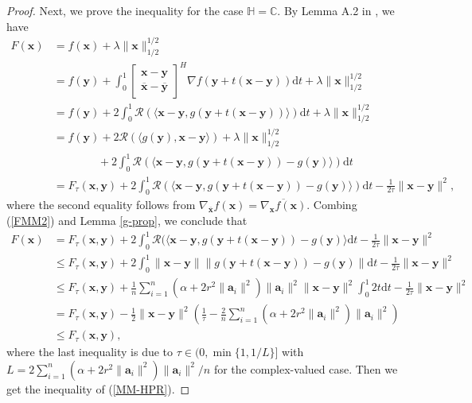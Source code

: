 \documentclass{article}
\numberwithin{equation}{section}
\begin{document}
\begin{proof}
Next, we prove the inequality for the case  $\mathbb{H}=\mathbb{C}$.
By Lemma A.2 in \cite{sun2018geometric}, we have
\begin{equation}\label{FMM2}
\begin{aligned}
	F(\mathbf{x})
	&=f(\mathbf{x})+\lambda\|\mathbf{x}\|_{1/2}^{1/2}\\
	&=f(\mathbf{y})+\int_0^1\begin{bmatrix} \mathbf{x}-\mathbf{y} \\
		\overline{\mathbf{x}}-\overline{\mathbf{y}} \end{bmatrix}^H\nabla{}f(\mathbf{y}+t(\mathbf{x}-\mathbf{y}))\mathrm{d}t+\lambda\|\mathbf{x}\|_{1/2}^{1/2}\\
	&=f(\mathbf{y})+2\int_0^1\mathcal{R}(\langle \mathbf{x}-\mathbf{y}, g(\mathbf{y}+t(\mathbf{x}-\mathbf{y}))\rangle) \mathrm{d}t+\lambda\|\mathbf{x}\|_{1/2}^{1/2}\\
	&=f(\mathbf{y})+2\mathcal{R}(\langle g(\mathbf{y}),\mathbf{x}-\mathbf{y}\rangle)+\lambda\|\mathbf{x}\|_{1/2}^{1/2}\\
	&\qquad\qquad+2\int_0^1\mathcal{R}(\langle \mathbf{x}-\mathbf{y}, g(\mathbf{y}+t(\mathbf{x}-\mathbf{y}))-g(\mathbf{y})\rangle) \mathrm{d}t\\
	&=F_{\tau}(\mathbf{x},\mathbf{y})+2\int_0^1\mathcal{R}(\langle \mathbf{x}-\mathbf{y}, g(\mathbf{y}+t(\mathbf{x}-\mathbf{y}))-g(\mathbf{y})\rangle) \mathrm{d}t-\frac{1}{2\tau}\|\mathbf{x}-\mathbf{y}\|^2,
\end{aligned}
\end{equation}
where the second equality follows from $\nabla_{\overline{\mathbf{x}}}f(\mathbf{x})=\overline{\nabla_{\mathbf{x}}f(\mathbf{x})}$.
Combing (\ref{FMM2}) and Lemma \ref{g-prop}, we conclude that
\begin{equation}
\begin{aligned}
	F(\mathbf{x})
	&=F_{\tau}(\mathbf{x},\mathbf{y})+2\int_0^1\mathcal{R}(\langle \mathbf{x}-\mathbf{y}, g(\mathbf{y}+t(\mathbf{x}-\mathbf{y}))-g(\mathbf{y})\rangle \mathrm{d}t-\frac{1}{2\tau}\|\mathbf{x}-\mathbf{y}\|^2\\
	&\leq F_{\tau}(\mathbf{x},\mathbf{y})+2\int_0^1\|\mathbf{x}-\mathbf{y}\|\|g(\mathbf{y}+t(\mathbf{x}-\mathbf{y}))-g(\mathbf{y})\| \mathrm{d}t-\frac{1}{2\tau}\|\mathbf{x}-\mathbf{y}\|^2\\
	&\leq F_{\tau}(\mathbf{x},\mathbf{y})+\frac{1}{n}\sum\limits_{i=1}^n (\alpha+2r^2\|\mathbf{a}_i\|^2)\|\mathbf{a}_i\|^2\|\mathbf{x}-\mathbf{y}\|^2\int_0^1 2t \mathrm{d}t-\frac{1}{2\tau}\|\mathbf{x}-\mathbf{y}\|^2\\
	&= F_{\tau}(\mathbf{x},\mathbf{y})-\frac{1}{2}\|\mathbf{x}-\mathbf{y}\|^2(\frac{1}{\tau}-\frac{2}{n}\sum\limits_{i=1}^n (\alpha+2r^2\|\mathbf{a}_i\|^2)\|\mathbf{a}_i\|^2)\\
	&\leq F_{\tau}(\mathbf{x},\mathbf{y}),\nonumber
\end{aligned}
\end{equation}
where the last inequality is due to $\tau\in(0, \min\{1, 1/L\}]$ with  $L=2\sum_{i=1}^n(\alpha+2r^2\|\mathbf{a}_i\|^2)\|\mathbf{a}_i\|^2/n$ for the complex-valued case. Then we get the inequality of (\ref{MM-HPR}).


\end{proof}
\end{document}

